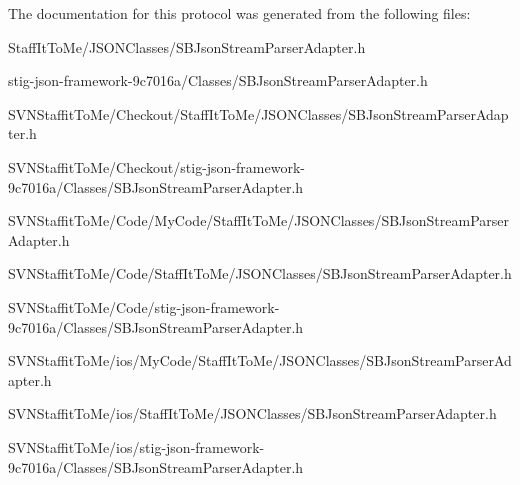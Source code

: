 \-The documentation for this protocol was generated from the following files\-:\begin{DoxyCompactItemize}
\item 
\-Staff\-It\-To\-Me/\-J\-S\-O\-N\-Classes/\-S\-B\-Json\-Stream\-Parser\-Adapter.\-h\item 
stig-\/json-\/framework-\/9c7016a/\-Classes/\-S\-B\-Json\-Stream\-Parser\-Adapter.\-h\item 
\-S\-V\-N\-Staffit\-To\-Me/\-Checkout/\-Staff\-It\-To\-Me/\-J\-S\-O\-N\-Classes/\-S\-B\-Json\-Stream\-Parser\-Adapter.\-h\item 
\-S\-V\-N\-Staffit\-To\-Me/\-Checkout/stig-\/json-\/framework-\/9c7016a/\-Classes/\-S\-B\-Json\-Stream\-Parser\-Adapter.\-h\item 
\-S\-V\-N\-Staffit\-To\-Me/\-Code/\-My\-Code/\-Staff\-It\-To\-Me/\-J\-S\-O\-N\-Classes/\-S\-B\-Json\-Stream\-Parser\-Adapter.\-h\item 
\-S\-V\-N\-Staffit\-To\-Me/\-Code/\-Staff\-It\-To\-Me/\-J\-S\-O\-N\-Classes/\-S\-B\-Json\-Stream\-Parser\-Adapter.\-h\item 
\-S\-V\-N\-Staffit\-To\-Me/\-Code/stig-\/json-\/framework-\/9c7016a/\-Classes/\-S\-B\-Json\-Stream\-Parser\-Adapter.\-h\item 
\-S\-V\-N\-Staffit\-To\-Me/ios/\-My\-Code/\-Staff\-It\-To\-Me/\-J\-S\-O\-N\-Classes/\-S\-B\-Json\-Stream\-Parser\-Adapter.\-h\item 
\-S\-V\-N\-Staffit\-To\-Me/ios/\-Staff\-It\-To\-Me/\-J\-S\-O\-N\-Classes/\-S\-B\-Json\-Stream\-Parser\-Adapter.\-h\item 
\-S\-V\-N\-Staffit\-To\-Me/ios/stig-\/json-\/framework-\/9c7016a/\-Classes/\-S\-B\-Json\-Stream\-Parser\-Adapter.\-h\end{DoxyCompactItemize}
